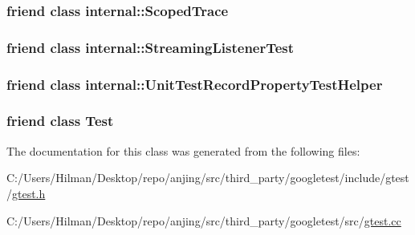 \subsubsection[{internal\+::\+Scoped\+Trace}]{\setlength{\rightskip}{0pt plus 5cm}friend class {\bf internal\+::\+Scoped\+Trace}\hspace{0.3cm}{\ttfamily [friend]}}\label{classtesting_1_1_unit_test_afa3927576c08d7b1e197ba16b2b3dcb7}
\hypertarget{classtesting_1_1_unit_test_adc037d188dab349a94868991955c9cd4}{}
\subsubsection[{internal\+::\+Streaming\+Listener\+Test}]{\setlength{\rightskip}{0pt plus 5cm}friend class internal\+::\+Streaming\+Listener\+Test\hspace{0.3cm}{\ttfamily [friend]}}\label{classtesting_1_1_unit_test_adc037d188dab349a94868991955c9cd4}
\hypertarget{classtesting_1_1_unit_test_ae970f89a9f477a349fe5778be85ef42e}{}
\subsubsection[{internal\+::\+Unit\+Test\+Record\+Property\+Test\+Helper}]{\setlength{\rightskip}{0pt plus 5cm}friend class {\bf internal\+::\+Unit\+Test\+Record\+Property\+Test\+Helper}\hspace{0.3cm}{\ttfamily [friend]}}\label{classtesting_1_1_unit_test_ae970f89a9f477a349fe5778be85ef42e}
\hypertarget{classtesting_1_1_unit_test_a5b78b1c2e1fa07ffed92da365593eaa4}{}
\subsubsection[{Test}]{\setlength{\rightskip}{0pt plus 5cm}friend class {\bf Test}\hspace{0.3cm}{\ttfamily [friend]}}\label{classtesting_1_1_unit_test_a5b78b1c2e1fa07ffed92da365593eaa4}


The documentation for this class was generated from the following files\+:\begin{DoxyCompactItemize}
\item 
C\+:/\+Users/\+Hilman/\+Desktop/repo/anjing/src/third\+\_\+party/googletest/include/gtest/\hyperlink{gtest_8h}{gtest.\+h}\item 
C\+:/\+Users/\+Hilman/\+Desktop/repo/anjing/src/third\+\_\+party/googletest/src/\hyperlink{gtest_8cc}{gtest.\+cc}\end{DoxyCompactItemize}
